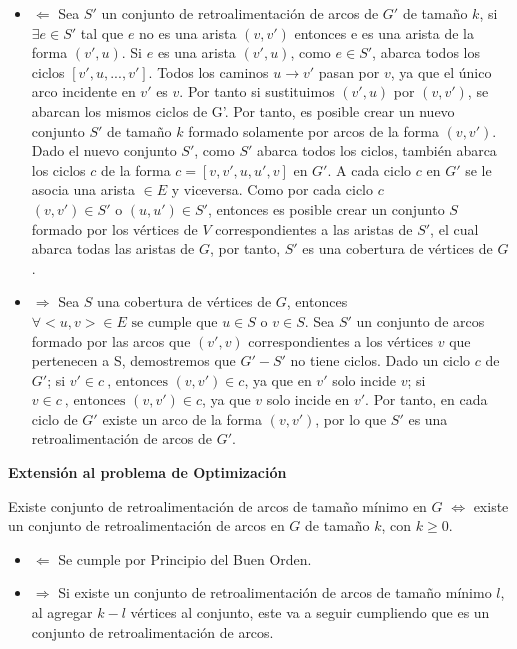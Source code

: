 \documentclass{article}
\begin{document}
\begin{itemize}
    \item \(\Leftarrow\) 
    Sea \(S'\) un conjunto de retroalimentación de arcos de \(G'\) de tamaño \(k\), si \(\exists e \in S'\) tal que \(e\) no es una arista  \((v,v')\) entonces e es una arista de la forma \((v',u) \). Si \( e\) es una arista \((v',u)\), como \(e \in S'\), abarca todos los ciclos \( [v',u,...,v']\). Todos los caminos \( u \rightarrow v'\) pasan por \(v\), ya que el único arco incidente en \(v'\) es \(v\). Por tanto si sustituimos \((v',u)\) por \((v,v')\), se abarcan los mismos ciclos de G'. Por tanto, es posible crear un nuevo conjunto \(S'\) de tamaño \(k\) formado solamente por arcos de la forma \((v,v')\). Dado el nuevo conjunto \(S'\), como \(S'\) abarca todos los ciclos, también abarca los ciclos \(c\) de la forma \(c = [v,v',u,u',v]\) en \(G'\). A cada ciclo \(c\) en \(G'\) se le asocia una arista \(<u,v> \in E\) y viceversa. Como por cada ciclo \(c\)  \((v,v') \in S' \text{ o } (u,u') \in S'\), entonces es posible crear un conjunto \(S\) formado por los vértices de \(V\) correspondientes a las aristas de \(S'\), el cual abarca todas las aristas de \(G\), por tanto, \(S'\) es una cobertura de vértices de \(G\).
    

    \item \(\Rightarrow\) 
    Sea \(S\) una cobertura de vértices de \(G\), entonces \(\forall <u,v> \in E \text{ se cumple que } u \in S \text{ o } v \in S\). Sea \(S'\) un conjunto de arcos formado por las arcos que \((v',v)\) correspondientes a los vértices \(v\) que pertenecen a S, demostremos que \(G'-S'\) no tiene ciclos. Dado un ciclo \(c\) de \(G'\); si \(v' \in c\ \text{, entonces } (v,v') \in c\), ya que en \(v'\) solo incide \(v\); si \(v \in c\ \text{, entonces } (v,v') \in c\), ya que \(v\) solo incide en \(v'\). Por tanto, en cada ciclo de \(G'\) existe un arco de la forma \((v,v')\), por lo que \(S'\) es una retroalimentación de arcos de \(G'\).
    
    

\end{itemize}

\textbf{Extensión al problema de Optimización}

Existe conjunto de retroalimentación de arcos de tamaño mínimo en \(G\) \(\iff\) existe un conjunto de retroalimentación de arcos en \(G\) de tamaño \(k\), con \(k \geq 0\).
\begin{itemize}
    \item \(\Leftarrow\) 
    Se cumple por Principio del Buen Orden.
    \item \(\Rightarrow\) 
    Si existe un conjunto de retroalimentación de arcos de tamaño mínimo \(l\), al agregar \(k-l\) vértices al conjunto, este va a seguir cumpliendo que es un conjunto de retroalimentación de arcos.
\end{itemize}
\end{document}
